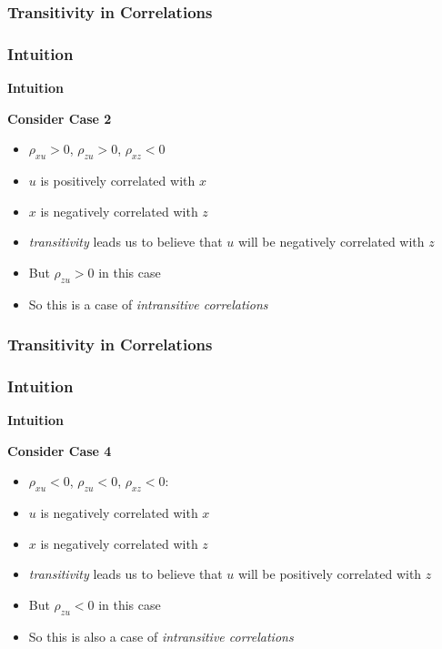\documentclass{beamer}
\begin{document}
\begin{frame}
\frametitle{Transitivity in Correlations}
\frametitle{Intuition}
\textbf{Intuition} \\ \bigskip \pause 

\textbf{Consider Case 2} \pause
\begin{itemize}
  \item $\rho_{xu}>0$, $\rho_{zu}>0$, $\rho_{xz}<0$ \pause
  \item $u$ is positively correlated with $x$ \pause 
  \item $x$ is negatively correlated with $z$ \pause 
  \item \emph{transitivity} leads us to believe that $u$ will be negatively correlated with $z$ \pause
  \item But $\rho_{zu}>0$ in this case \pause
  \item So this is a case of \emph{intransitive correlations}
\end{itemize}

\end{frame}

\begin{frame}
\frametitle{Transitivity in Correlations}
\frametitle{Intuition}
\textbf{Intuition} \\ \bigskip \pause 

\textbf{Consider Case 4}
\begin{itemize}
  \item $\rho_{xu}<0$, $\rho_{zu}<0$, $\rho_{xz}<0:$ \pause 
  \item $u$ is negatively correlated with $x$ \pause 
  \item $x$ is negatively correlated with $z$ \pause 
  \item \emph{transitivity} leads us to believe that $u$ will be positively correlated with $z$ \pause 
  \item But $\rho_{zu}<0$ in this case \pause 
  \item So this is also a case of \emph{intransitive correlations} 
\end{itemize}

\end{frame}
\end{document}
